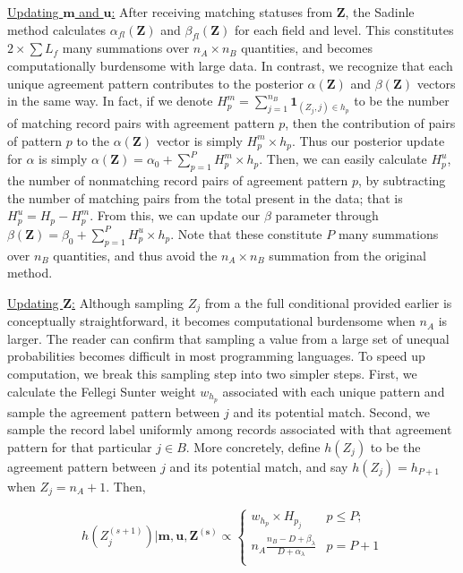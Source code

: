 \documentclass[
  12pt,
]{article}
\begin{document}
\underline{Updating $\mathbf{m}$ and $\mathbf{u}$:} After receiving
matching statuses from \(\mathbf{Z}\), the Sadinle method calculates
\(\alpha_{fl}(\mathbf{Z})\) and \(\beta_{fl}(\mathbf{Z})\) for each
field and level. This constitutes \(2 \times \sum L_f\) many summations
over \(n_A \times n_B\) quantities, and becomes computationally
burdensome with large data. In contrast, we recognize that each unique
agreement pattern contributes to the posterior \(\alpha(\mathbf{Z})\)
and \(\beta(\mathbf{Z})\) vectors in the same way. In fact, if we denote
\(H_p^m = \sum_{j=1}^{n_B} \mathbf{1}_{(Z_j, j) \in h_p}\) to be the
number of matching record pairs with agreement pattern \(p\), then the
contribution of pairs of pattern \(p\) to the \(\alpha(\mathbf{Z})\)
vector is simply \(H_p^m \times h_p\). Thus our posterior update for
\(\alpha\) is simply
\(\alpha(\mathbf{Z}) = \alpha_0 + \sum_{p=1}^P H_p^m \times h_p\). Then,
we can easily calculate \(H_p^u\), the number of nonmatching record
pairs of agreement pattern \(p\), by subtracting the number of matching
pairs from the total present in the data; that is
\(H_p^u = H_p - H_p^m\). From this, we can update our \(\beta\)
parameter through
\(\beta(\mathbf{Z}) = \beta_0 + \sum_{p=1}^P H_p^u \times h_p\). Note
that these constitute \(P\) many summations over \(n_B\) quantities, and
thus avoid the \(n_A \times n_B\) summation from the original method.

\underline{Updating $\mathbf{Z}$:} Although sampling \(Z_j\) from a the
full conditional provided earlier is conceptually straightforward, it
becomes computational burdensome when \(n_A\) is larger. The reader can
confirm that sampling a value from a large set of unequal probabilities
becomes difficult in most programming languages. To speed up
computation, we break this sampling step into two simpler steps. First,
we calculate the Fellegi Sunter weight \(w_{h_p}\) associated with each
unique pattern and sample the agreement pattern between \(j\) and its
potential match. Second, we sample the record label uniformly among
records associated with that agreement pattern for that particular
\(j\in B\). More concretely, define \(h(Z_j)\) to be the agreement
pattern between \(j\) and its potential match, and say
\(h(Z_j) = h_{P+1}\) when \(Z_j = n_A + 1\). Then,

\[h\left(Z_j^{(s+1)}\right) | \mathbf{m}, \mathbf{u}, \mathbf{Z^{(s)}} \propto
\begin{cases} 
    w_{h_p}\times H_{p_j}  & p \leq P; \\
     n_A \frac{n_B - D + \beta_{\lambda}}{D + \alpha_{\lambda}} &   p = P + 1 \\
\end{cases}\]
\end{document}
